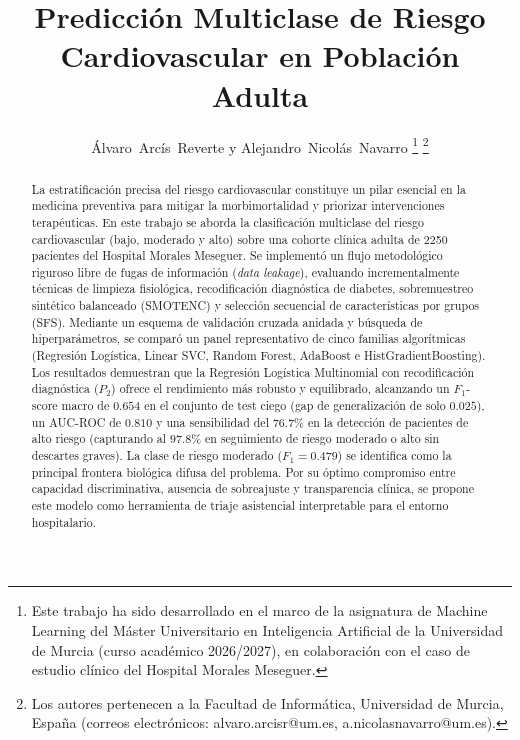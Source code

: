 \documentclass[journal,onecolumn]{IEEEtran}
\begin{document}
\title{Predicción Multiclase de Riesgo Cardiovascular en Población Adulta}

\author{Álvaro~Arcís~Reverte y Alejandro~Nicolás~Navarro%
\thanks{Este trabajo ha sido desarrollado en el marco de la asignatura de Machine Learning del Máster Universitario en Inteligencia Artificial de la Universidad de Murcia (curso académico 2026/2027), en colaboración con el caso de estudio clínico del Hospital Morales Meseguer.}%
\thanks{Los autores pertenecen a la Facultad de Informática, Universidad de Murcia, España (correos electrónicos: alvaro.arcisr@um.es, a.nicolasnavarro@um.es).}}

\maketitle

\begin{abstract}
La estratificación precisa del riesgo cardiovascular constituye un pilar esencial en la medicina preventiva para mitigar la morbimortalidad y priorizar intervenciones terapéuticas. En este trabajo se aborda la clasificación multiclase del riesgo cardiovascular (bajo, moderado y alto) sobre una cohorte clínica adulta de 2250 pacientes del Hospital Morales Meseguer. Se implementó un flujo metodológico riguroso libre de fugas de información (\textit{data leakage}), evaluando incrementalmente técnicas de limpieza fisiológica, recodificación diagnóstica de diabetes, sobremuestreo sintético balanceado (\textsc{SMOTENC}) y selección secuencial de características por grupos (\textsc{SFS}). Mediante un esquema de validación cruzada anidada y búsqueda de hiperparámetros, se comparó un panel representativo de cinco familias algorítmicas (Regresión Logística, Linear SVC, Random Forest, AdaBoost e HistGradientBoosting). Los resultados demuestran que la Regresión Logística Multinomial con recodificación diagnóstica ($P_2$) ofrece el rendimiento más robusto y equilibrado, alcanzando un $F_1$-score macro de $0{.}654$ en el conjunto de test ciego (gap de generalización de solo $0{.}025$), un AUC-ROC de $0{.}810$ y una sensibilidad del $76{.}7\%$ en la detección de pacientes de alto riesgo (capturando al $97{.}8\%$ en seguimiento de riesgo moderado o alto sin descartes graves). La clase de riesgo moderado ($F_1 = 0{.}479$) se identifica como la principal frontera biológica difusa del problema. Por su óptimo compromiso entre capacidad discriminativa, ausencia de sobreajuste y transparencia clínica, se propone este modelo como herramienta de triaje asistencial interpretable para el entorno hospitalario.
\end{abstract}
\end{document}
